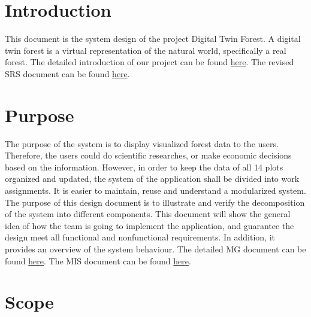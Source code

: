 \documentclass[12pt, titlepage]{article}
\begin{document}
\tableofcontents

\newpage

\listoftables

\listoffigures

\newpage


\section{Introduction}

This document is the system design of the project Digital Twin Forest. A digital twin forest
 is a virtual representation of the natural world, specifically a real forest. The detailed
  introduction of our project can be found \href{https://github.com/wuj187/DigitalTwinCAS/blob/main/docs/ProblemStatementAndGoals/ProblemStatement.pdf}{here}. 
  The revised SRS document can be found
   \href{https://github.com/wuj187/DigitalTwinCAS/blob/main/docs/DocRevision/SRSRevision/SRSRevision.pdf}{here}.

\section{Purpose}

The purpose of the system is to display visualized 
forest data to the users. Therefore, the users could do scientific researches, or make
economic decisions based on the information. However, in order to keep the data of all 14
plots organized and updated, the system of the application shall be divided into work
assignments. It is easier to maintain, reuse and understand a  modularized system.\\

\noindent The purpose of this design document is to illustrate and verify the decomposition of
the system into different components. This document will show the general idea of how the team
is going to implement the application, and guarantee the design meet all functional and
nonfunctional requirements. In addition, it provides an overview of the system behaviour. The
detailed MG document can be found \href{https://github.com/wuj187/DigitalTwinCAS/blob/main/docs/Design/Software-Architecture-Design/MG.pdf}{here}. 
The MIS document can be found \href{https://github.com/wuj187/DigitalTwinCAS/blob/main/docs/Design/Software-Detailed-Design/MIS.pdf}{here}.

\section{Scope}
\end{document}
